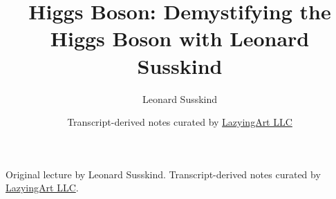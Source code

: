 \documentclass[11pt,oneside]{book}
\begin{document}
\frontmatter
\title{Higgs Boson: Demystifying the Higgs Boson with Leonard Susskind}
\author{Leonard Susskind}
\date{Transcript-derived notes curated by \href{https://lazying.art}{LazyingArt LLC}}
\maketitle
\begin{center}
\small Original lecture by Leonard Susskind. Transcript-derived notes curated by \href{https://lazying.art}{LazyingArt LLC}.
\end{center}
\clearpage
\mainmatter

\end{document}
